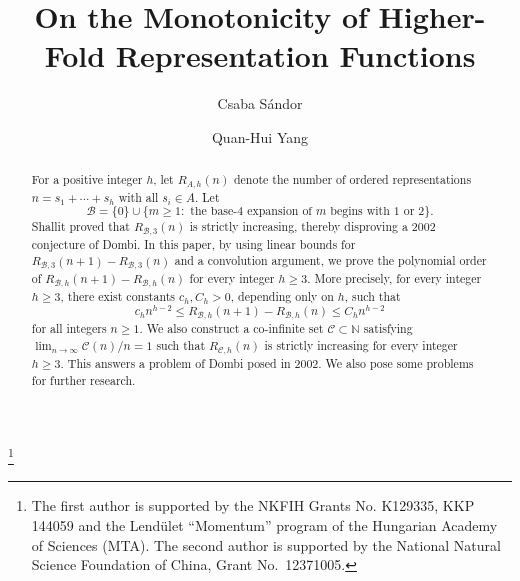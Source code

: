 \documentclass[11pt]{amsart}
\theoremstyle{remark}
\theoremstyle{plain}
\newcommand{\BaseB}{\mathcal B}
\newcommand{\NewB}{\mathcal C}
\begin{document}
\title[Monotonicity and polynomial growth]{On the Monotonicity of Higher-Fold Representation Functions}
\author{Csaba S\'andor}
\address{Department of Stochastics, Institute of Mathematics, Budapest University of Technology and Economics, M\H{u}egyetem rkp. 3., H-1111 Budapest, Hungary; \newline \hspace*{4mm}
HUN-REN Alfr\'ed R\'enyi Institute of Mathematics, Re\'altanoda utca 13--15., H-1053 Budapest,  Hungary; \newline \hspace*{4mm}
MTA--HUN-REN RI Lend\"ulet ``Momentum'' Arithmetic Combinatorics Research Group, Re\'altanoda utca 13--15., H-1053 Budapest,  Hungary.}

\author{Quan-Hui Yang}
\address{School of Mathematical Sciences and Ministry of Education Key Laboratory for NSLSCS,
Nanjing Normal University, Nanjing 210023, P. R. China}
\thanks{The first author is supported by the NKFIH Grants No. K129335, KKP 144059 and the Lend\"ulet ``Momentum'' program of the Hungarian Academy of Sciences (MTA).
The second author is supported by the National Natural Science Foundation of China, Grant No.~12371005.}

\date{}
\begingroup
\renewcommand{\thefootnote}{}
\addtocounter{footnote}{-1}
\endgroup
{}
\begin{abstract}
For a positive integer $h$, let $R_{A,h}(n)$ denote the number of ordered representations
$n=s_1+\cdots+s_h$ with all $s_i\in A$. Let
\[
\BaseB=\{0\}\cup\{m\ge 1:\text{ the base-4 expansion of }m\text{ begins with }1\text{ or }2\}.
\]
Shallit proved that $R_{\BaseB,3}(n)$ is strictly increasing, thereby disproving a 2002 conjecture of Dombi. In this paper, by using linear bounds for
$R_{\BaseB,3}(n+1)-R_{\BaseB,3}(n)$ and a convolution argument, we prove the polynomial order of
$R_{\BaseB,h}(n+1)-R_{\BaseB,h}(n)$ for every integer $h\ge 3$. More precisely, for every integer $h\ge 3$, there exist constants $c_h,C_h>0$, depending only on $h$, such that
\[
 c_h n^{h-2}\le R_{\BaseB,h}(n+1)-R_{\BaseB,h}(n)\le C_h n^{h-2}
\]
for all integers $n\ge 1$. We also construct a co-infinite set $\NewB\subset\mathbb N$ satisfying
$\lim_{n\to\infty}\NewB(n)/n=1$ such that $R_{\NewB,h}(n)$ is strictly increasing for every integer $h\ge 3$. This answers a problem of Dombi posed in 2002. We also pose some problems for further research.
\end{abstract}
\end{document}
